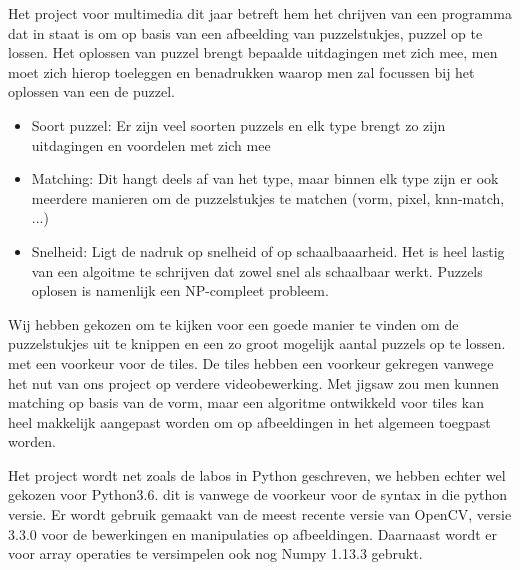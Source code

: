 Het project voor multimedia dit jaar betreft hem het chrijven van een programma dat in staat is om op basis van een afbeelding van puzzelstukjes, puzzel op te lossen.
Het oplossen van puzzel brengt bepaalde uitdagingen met zich mee, men moet zich hierop toeleggen en benadrukken waarop men zal focussen bij het oplossen van een de puzzel.
\begin{itemize}
    \item Soort puzzel: Er zijn veel soorten puzzels en elk type brengt zo zijn uitdagingen en voordelen met zich mee
    \item Matching: Dit hangt deels af van het type, maar binnen elk type zijn er ook meerdere manieren om de puzzelstukjes te matchen (vorm, pixel, knn-match, ...)
    \item Snelheid: Ligt de nadruk op snelheid of op schaalbaaarheid. Het is heel lastig van een algoitme te schrijven dat zowel snel als schaalbaar werkt. Puzzels oplosen is namenlijk een NP-compleet probleem.
\end{itemize}

Wij hebben gekozen om te kijken voor een goede manier te vinden om de puzzelstukjes uit te knippen en een zo groot mogelijk aantal puzzels op te lossen. met een voorkeur voor de tiles.
De tiles hebben een voorkeur gekregen vanwege het nut van ons project op verdere videobewerking. Met jigsaw zou men kunnen matching op basis van de vorm, maar een algoritme ontwikkeld voor tiles
kan heel makkelijk aangepast worden om op afbeeldingen in het algemeen toegpast worden.

Het project wordt net zoals de labos in Python geschreven, we hebben echter wel gekozen voor Python3.6. dit is vanwege de voorkeur voor de syntax in die python versie. Er wordt gebruik gemaakt van de meest recente versie van OpenCV, versie 3.3.0
voor de bewerkingen en manipulaties op afbeeldingen. Daarnaast wordt er voor array operaties te versimpelen ook nog Numpy 1.13.3 gebrukt.